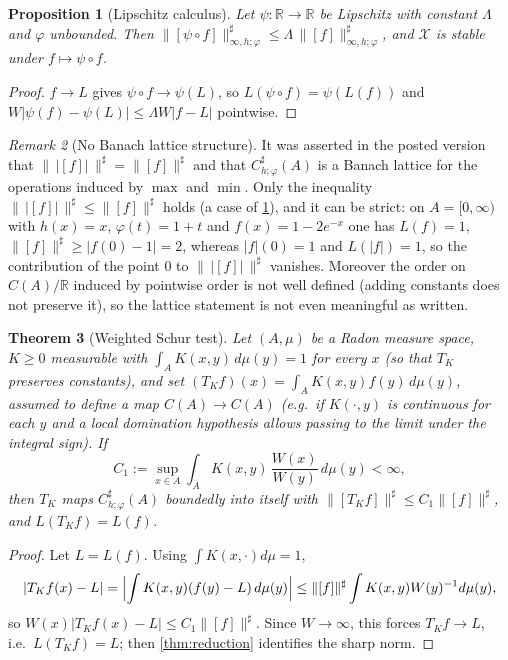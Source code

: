 \documentclass[11pt,a4paper]{article}
\numberwithin{equation}{section}
\theoremstyle{plain}
\newtheorem{theorem}{Theorem}[section]
\newtheorem{proposition}[theorem]{Proposition}
\theoremstyle{definition}
\theoremstyle{remark}
\newtheorem{remark}[theorem]{Remark}
\newcommand{\R}{\mathbb{R}}
\newcommand{\Xdec}{\mathcal{X}}
\begin{document}
\begin{proposition}[Lipschitz calculus]\label{prop:lipschitz}
Let $\psi:\R\to\R$ be Lipschitz with constant $\Lambda$ and $\varphi$ unbounded. Then
$\|[\psi\circ f]\|^{\sharp}_{\infty,h;\varphi}\le\Lambda\,\|[f]\|^{\sharp}_{\infty,h;\varphi}$,
and $\Xdec$ is stable under $f\mapsto\psi\circ f$.
\end{proposition}

\begin{proof}
$f\to L$ gives $\psi\circ f\to\psi(L)$, so $L(\psi\circ f)=\psi(L(f))$ and
$W|\psi(f)-\psi(L)|\le\Lambda W|f-L|$ pointwise.
\end{proof}

\begin{remark}[No Banach lattice structure]\label{rem:no-lattice}
It was asserted in the posted version that
$\|\,|[f]|\,\|^{\sharp}=\|[f]\|^{\sharp}$ and that $C^{\sharp}_{h;\varphi}(A)$ is a Banach
lattice for the operations induced by $\max$ and $\min$. Only the inequality
$\|\,|[f]|\,\|^{\sharp}\le\|[f]\|^{\sharp}$ holds (a case of \cref{prop:lipschitz}), and
it can be strict: on $A=[0,\infty)$ with $h(x)=x$, $\varphi(t)=1+t$ and
$f(x)=1-2e^{-x}$ one has $L(f)=1$, $\|[f]\|^{\sharp}\ge|f(0)-1|=2$, whereas
$|f|(0)=1$ and $L(|f|)=1$, so the contribution of the point $0$ to
$\|\,|[f]|\,\|^{\sharp}$ vanishes. Moreover the order on $C(A)/\R$ induced by pointwise
order is not well defined (adding constants does not preserve it), so the lattice
statement is not even meaningful as written.
\end{remark}

\begin{theorem}[Weighted Schur test]\label{thm:schur}
Let $(A,\mu)$ be a Radon measure space, $K\ge0$ measurable with
$\int_AK(x,y)\,d\mu(y)=1$ for every $x$ (so that $T_K$ preserves constants), and set
$(T_Kf)(x)=\int_AK(x,y)f(y)\,d\mu(y)$, assumed to define a map $C(A)\to C(A)$ (e.g.\ if
$K(\cdot,y)$ is continuous for each $y$ and a local domination hypothesis allows passing to
the limit under the integral sign). If
\[
C_1:=\sup_{x\in A}\int_A K(x,y)\,\frac{W(x)}{W(y)}\,d\mu(y)<\infty,
\]
then $T_K$ maps $C^{\sharp}_{h;\varphi}(A)$ boundedly into itself with
$\|[T_Kf]\|^{\sharp}\le C_1\|[f]\|^{\sharp}$, and $L(T_Kf)=L(f)$.
\end{theorem}

\begin{proof}
Let $L=L(f)$. Using $\int K(x,\cdot)d\mu=1$,
\[
|T_Kf(x)-L|=\Bigl|\int K(x,y)(f(y)-L)\,d\mu(y)\Bigr|
\le \|[f]\|^{\sharp}\int K(x,y)W(y)^{-1}d\mu(y),
\]
so $W(x)|T_Kf(x)-L|\le C_1\|[f]\|^{\sharp}$. Since $W\to\infty$, this forces
$T_Kf\to L$, i.e.\ $L(T_Kf)=L$; then \cref{thm:reduction} identifies the sharp norm.
\end{proof}
\end{document}
